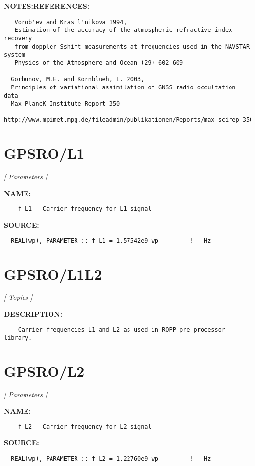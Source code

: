 \textbf{NOTES:}\hspace{0.08in}\textbf{REFERENCES:}\hspace{0.08in}\begin{Verbatim}
   Vorob'ev and Krasil'nikova 1994, 
   Estimation of the accuracy of the atmospheric refractive index recovery
   from doppler Sshift measurements at frequencies used in the NAVSTAR system
   Physics of the Atmosphere and Ocean (29) 602-609

  Gorbunov, M.E. and Kornblueh, L. 2003,
  Principles of variational assimilation of GNSS radio occultation data
  Max PlancK Institute Report 350 
  http://www.mpimet.mpg.de/fileadmin/publikationen/Reports/max_scirep_350.pdf
\end{Verbatim}
\section{GPSRO/L1}
\textsl{[ Parameters ]}

\label{ch:robo21}
\label{ch:GPSRO_L1}
\textbf{NAME:}\hspace{0.08in}\begin{Verbatim}
    f_L1 - Carrier frequency for L1 signal 
\end{Verbatim}
\textbf{SOURCE:}\hspace{0.08in}\begin{Verbatim}
  REAL(wp), PARAMETER :: f_L1 = 1.57542e9_wp         !   Hz
\end{Verbatim}
\section{GPSRO/L1L2}
\textsl{[ Topics ]}

\label{ch:robo22}
\label{ch:GPSRO_L1L2}
\textbf{DESCRIPTION:}\hspace{0.08in}\begin{Verbatim}
    Carrier frequencies L1 and L2 as used in ROPP pre-processor library.
\end{Verbatim}
\section{GPSRO/L2}
\textsl{[ Parameters ]}

\label{ch:robo23}
\label{ch:GPSRO_L2}
\textbf{NAME:}\hspace{0.08in}\begin{Verbatim}
    f_L2 - Carrier frequency for L2 signal 
\end{Verbatim}
\textbf{SOURCE:}\hspace{0.08in}\begin{Verbatim}
  REAL(wp), PARAMETER :: f_L2 = 1.22760e9_wp         !   Hz
\end{Verbatim}
